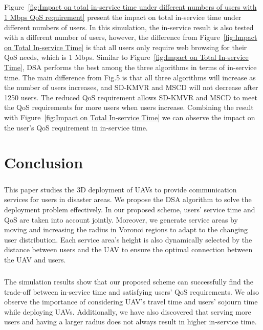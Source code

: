 \documentclass[a4paper,12pt]{report}
\begin{document}
\paragraph{}
Figure~\ref{fig:Impact on total in-service time under different numbers of users with 1 Mbps QoS requirement} present the impact on total in-service time under different numbers of users. In this simulation, the in-service result is also tested with a different number of users, however, the difference from Figure~\ref{fig:Impact on Total In-service Time} is that all users only require web browsing for their QoS needs, which is 1 Mbps. Similar to Figure~\ref{fig:Impact on Total In-service Time}, DSA performs the best among the three algorithms in terms of in-service time. The main difference from Fig.5 is that all three algorithms will increase as the number of users increases, and SD-KMVR and MSCD will not decrease after 1250 users. The reduced QoS requirement allows SD-KMVR and MSCD to meet the QoS requirements for more users when users increase. Combining the result with Figure~\ref{fig:Impact on Total In-service Time} we can observe the impact on the user's QoS requirement in in-service time.

\chapter{Conclusion}
\paragraph{}
This paper studies the 3D deployment of UAVs to provide communication services for users in disaster areas. We propose the DSA algorithm to solve the deployment problem effectively. In our proposed scheme, users' service time and QoS are taken into account jointly. Moreover, we generate service areas by moving and increasing the radius in Voronoi regions to adapt to the changing user distribution. Each service area's height is also dynamically selected by the distance between users and the UAV to ensure the optimal connection between the UAV and users.
\paragraph{}
The simulation results show that our proposed scheme can successfully find the trade-off between in-service time and satisfying users' QoS requirements. We also observe the importance of considering UAV's travel time and users' sojourn time while deploying UAVs. Additionally, we have also discovered that serving more users and having a larger radius does not always result in higher in-service time.

\newpage
{}


\end{document}
